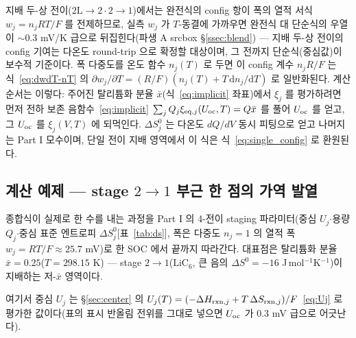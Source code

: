 지배 두-상 전이($2\mathrm L\!\to\!2\cdot2\!\to\!1$)에서는 완전식의 config 항이 폭의 열적 서식 $w_j=n_jRT/F$ 를
전제하므로, 실측 $w_j$ 가 $T$-동결에 가까우면 완전식 대 단순식의 우열이 $\sim$0.3 mV/K 급으로 뒤집힌다(파생 A
srcbox \S\ref{ssec:blend}) --- 지배 두-상 전이의 config 기여는 다온도 round-trip 으로 확정할 대상이며, 그
전까지 단순식(중심값)이 보수적 기준이다. 폭 다중도를 온도 함수 $n_j(T)$ 로 두면 이 config 계수 $n_jR/F$ 는
식~\eqref{eq:dwdT-nT} 의 $\partial w_j/\partial T=(R/F)(n_j(T)+T\,\mathrm{d}n_j/\mathrm{d}T)$ 로 일반화된다.
계산 순서는 이렇다: 주어진 탈리튬화 분율 $\bar x$(식~\eqref{eq:implicit} 좌표)에서 $\xi_j$ 를 평가하려면 먼저
전하 보존 음함수~\eqref{eq:implicit} $\sum_j Q_j\xi_{\mathrm{eq},j}(U_{\mathrm{oc}},T)=Q\bar x$ 를 풀어 $U_{\mathrm{oc}}$ 를 얻고, 그
$U_{\mathrm{oc}}$ 를 $\xi_j(V,T)$ 에 되먹인다. $\Delta S^0_j$ 는 다온도 $dQ/dV$ 동시 피팅으로 얻고 나머지는 Part I
모수이며, 단일 전이 지배 영역에서 이 식은 식~\eqref{eq:single_config} 로 환원된다.

\subsection{계산 예제 --- stage $2\!\to\!1$ 부근 한 점의 가역 발열}\label{ssec:worked}
종합식이 실제로 한 수를 내는 과정을 Part I 의 4-전이 staging 파라미터(중심 $U_j$$\cdot$용량 $Q_j$$\cdot$중심
표준 엔트로피 $\Delta S^0_j$[표~\ref{tab:ds}], 폭은 다중도 $n_j{=}1$ 의 열적 폭 $w_j{=}RT/F\!\approx\!25.7$ mV)로
한 SOC 에서 끝까지 따라간다. 대표점은 탈리튬화 분율 $\bar x=0.25$($T=298.15$ K) --- stage
$2\!\to\!1$($\mathrm{LiC_6}$, 큰 음의 $\Delta S^0=-16$ J\,mol$^{-1}$K$^{-1}$)이 지배하는 저-$\bar x$ 영역이다.

여기서 중심 $U_j$ 는 \S\ref{sec:center} 의 $U_j(T)=(-\Delta H_{\mathrm{rxn},j}+T\,\Delta S_{\mathrm{rxn},j})/F$~\eqref{eq:Uj} 로 평가한
값이다(표의 표시 반올림 전위를 그대로 넣으면 $U_{\mathrm{oc}}$ 가 $0.3$ mV 급으로 어긋난다).

